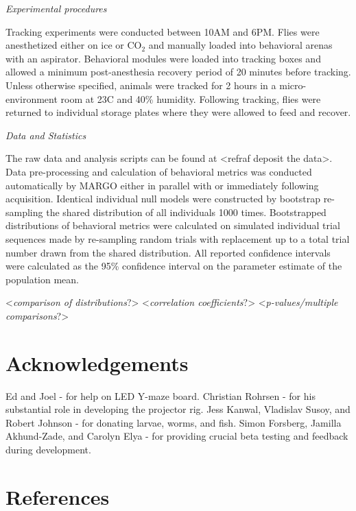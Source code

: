 \documentclass[10pt]{article}
\begin{document}
\begin{multicols}{2}
\textit{Experimental procedures}

Tracking experiments were conducted between 10AM and 6PM. Flies were anesthetized either on ice or CO$_{2}$ and manually loaded into behavioral arenas with an aspirator. Behavioral modules were loaded into tracking boxes and allowed a minimum post-anesthesia recovery period of 20 minutes before tracking. Unless otherwise specified, animals were tracked for 2 hours in a micro-environment room at 23\degree  C and 40\% humidity. Following tracking, flies were returned to individual storage plates where they were allowed to feed and recover.

\textit{Data and Statistics}

The raw data and analysis scripts can be found at <refraf deposit the data>. Data pre-processing and calculation of behavioral metrics was conducted automatically by MARGO either in parallel with or immediately following acquisition. Identical individual null models were constructed by bootstrap re-sampling the shared distribution of all individuals 1000 times. Bootstrapped distributions of behavioral metrics were calculated on simulated individual trial sequences made by re-sampling random trials with replacement up to a total trial number drawn from the shared distribution. All reported confidence intervals were calculated as the 95\% confidence interval on the parameter estimate of the population mean.

<\textit{comparison of distributions}?>
<\textit{correlation coefficients}?>
<\textit{p-values/multiple comparisons}?>

\section*{Acknowledgements}

Ed and Joel - for help on LED Y-maze board.
Christian Rohrsen - for his substantial role in developing the projector rig.
Jess Kanwal, Vladislav Susoy, and Robert Johnson - for donating larvae, worms, and fish.
Simon Forsberg, Jamilla Akhund-Zade, and Carolyn Elya - for providing crucial beta testing and feedback during development.

\end{multicols}

\section*{References}
\end{document}
